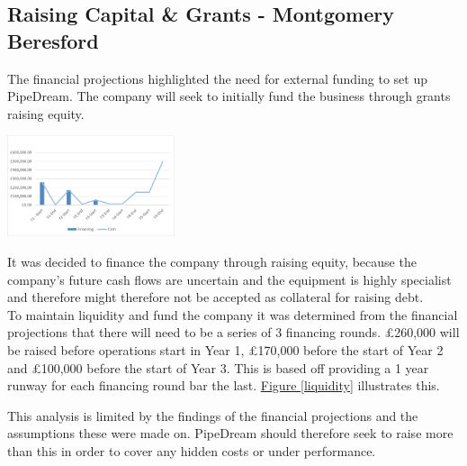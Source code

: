 \documentclass[11pt]{article}		%
\newcommand{\figref}[1]{\hyperref[#1]{Figure \ref*{#1}}}    %
\begin{document}
				
				
			    
		\subsection[Raising Capital \& Grants]{Raising Capital \& Grants - Montgomery Beresford} \label{raisingFunds}
		
		  The financial projections highlighted the need for external funding to set up PipeDream. The company will seek to initially fund the business through grants raising equity. 
		  \begin{floatingfigure}[r]{0.4\textwidth}
    			\centering
    			\includegraphics[width=0.37\textwidth]{CashFlow}
    			\label{liquidity}
	        \end{floatingfigure}
		\hspace*{3ex}It was decided to finance the company through raising equity, because the company's future cash flows are uncertain and the equipment  is highly specialist and therefore might therefore not be accepted as collateral for raising debt.
		\\ 
        \hspace*{3ex}To maintain liquidity and fund the company it was determined from the financial projections that there will need to be a series of 3 financing rounds. £260,000 will be raised before operations start in Year 1, £170,000 before the start of Year 2 and £100,000 before the start of Year 3. This is based off providing a 1 year runway for each financing round bar the last. \figref{liquidity} illustrates this. 
	    \begin{floatingfigure}[r]{0pt} \end{floatingfigure}
	    \hspace*{3ex}This analysis is limited by the findings of the financial projections and the assumptions these were made on. PipeDream should therefore seek to raise more than this in order to cover any hidden costs or under performance.
 
\end{document}
